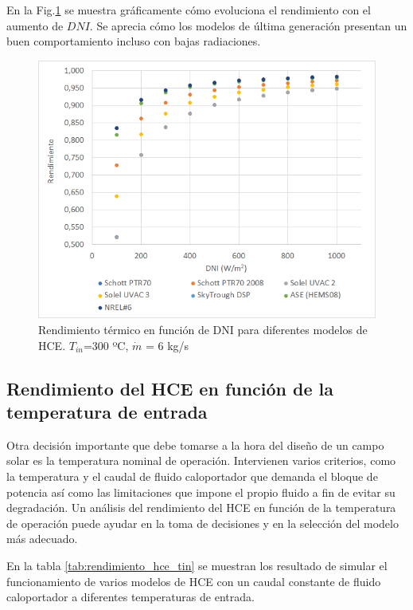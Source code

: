 En la Fig.\ref{fig:test1a} se muestra gráficamente cómo evoluciona el rendimiento con el aumento de $DNI$.  Se aprecia cómo los  modelos de última generación presentan un buen comportamiento incluso con bajas radiaciones.

\begin{figure}[H]
\includegraphics[width=0.9\linewidth]{images/rendimiento_dni.png}
\caption[Rendimiento térmico en función de DNI para diferentes modelos de HCE]{Rendimiento térmico en función de DNI para diferentes modelos de HCE. $T_{in}$=300 ºC, $\dot m$ = 6 kg/s} 
\label{fig:test1a}
\end{figure}


\subsection{Rendimiento del HCE en función de la temperatura de entrada}

Otra decisión importante que debe tomarse a la hora del diseño de  un campo solar es la temperatura nominal de operación. Intervienen varios criterios, como la temperatura y el caudal de fluido caloportador que demanda el bloque de potencia así como las limitaciones que impone el propio fluido a fin de evitar su degradación.  Un análisis del rendimiento del HCE en función de la temperatura de operación puede ayudar en la toma de decisiones y  en la selección del modelo más adecuado.

En la tabla \ref{tab:rendimiento_hce_tin} se muestran los resultado de simular el funcionamiento de varios modelos de HCE con un caudal constante de fluido caloportador a diferentes temperaturas de entrada.

